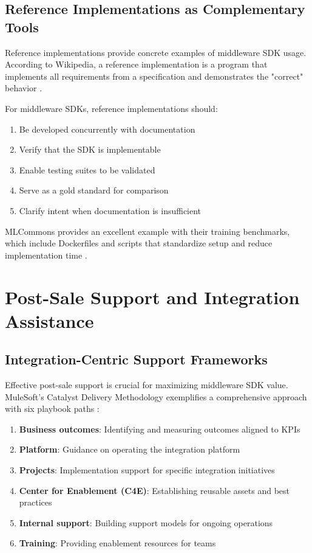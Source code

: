 \documentclass[11pt,a4paper]{article}
\begin{document}
\subsection{Reference Implementations as Complementary Tools}

Reference implementations provide concrete examples of middleware SDK usage. According to Wikipedia, a reference implementation is a program that implements all requirements from a specification and demonstrates the "correct" behavior \cite{wikipedia2023}.

For middleware SDKs, reference implementations should:
\begin{enumerate}
    \item Be developed concurrently with documentation
    \item Verify that the SDK is implementable
    \item Enable testing suites to be validated
    \item Serve as a gold standard for comparison
    \item Clarify intent when documentation is insufficient
\end{enumerate}

MLCommons provides an excellent example with their training benchmarks, which include Dockerfiles and scripts that standardize setup and reduce implementation time \cite{mlcommons2023}.

\section{Post-Sale Support and Integration Assistance}

\subsection{Integration-Centric Support Frameworks}

Effective post-sale support is crucial for maximizing middleware SDK value. MuleSoft's Catalyst Delivery Methodology exemplifies a comprehensive approach with six playbook paths \cite{mulesoft2023}:

\begin{enumerate}
    \item \textbf{Business outcomes}: Identifying and measuring outcomes aligned to KPIs
    \item \textbf{Platform}: Guidance on operating the integration platform
    \item \textbf{Projects}: Implementation support for specific integration initiatives
    \item \textbf{Center for Enablement (C4E)}: Establishing reusable assets and best practices
    \item \textbf{Internal support}: Building support models for ongoing operations
    \item \textbf{Training}: Providing enablement resources for teams
\end{enumerate}
\end{document}
